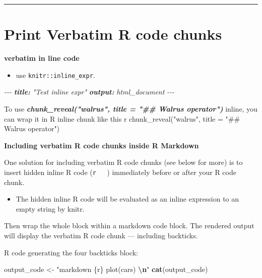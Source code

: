 \documentclass[
]{book}
\newenvironment{Shaded}{\begin{snugshade}}{\end{snugshade}}
\newcommand{\AnnotationTok}[1]{\textcolor[rgb]{0.56,0.35,0.01}{\textbf{\textit{#1}}}}
\newcommand{\CommentTok}[1]{\textcolor[rgb]{0.56,0.35,0.01}{\textit{#1}}}
\newcommand{\FunctionTok}[1]{\textcolor[rgb]{0.13,0.29,0.53}{\textbf{#1}}}
\newcommand{\InformationTok}[1]{\textcolor[rgb]{0.56,0.35,0.01}{\textbf{\textit{#1}}}}
\newcommand{\NormalTok}[1]{#1}
\newcommand{\OtherTok}[1]{\textcolor[rgb]{0.56,0.35,0.01}{#1}}
\newcommand{\SpecialCharTok}[1]{\textcolor[rgb]{0.81,0.36,0.00}{\textbf{#1}}}
\newcommand{\StringTok}[1]{\textcolor[rgb]{0.31,0.60,0.02}{#1}}
\providecommand{\tightlist}{%
  \setlength{\itemsep}{0pt}\setlength{\parskip}{0pt}}
\theoremstyle{definition}
\theoremstyle{definition}
\theoremstyle{definition}
\theoremstyle{definition}
\theoremstyle{remark}
\begin{document}
\begin{center}\rule{0.5\linewidth}{0.5pt}\end{center}

\section{Print Verbatim R code chunks}\label{print-verbatim-r-code-chunks}

\textbf{verbatim in line code}

\begin{itemize}
\tightlist
\item
  use \texttt{knitr::inline\_expr}.
\end{itemize}

\begin{Shaded}
\begin{Highlighting}[]
\CommentTok{{-}{-}{-}}
\AnnotationTok{title:}\CommentTok{ "Test inline expr"}
\AnnotationTok{output:}\CommentTok{ html\_document}
\CommentTok{{-}{-}{-}}

\NormalTok{To use }\InformationTok{\textasciigrave{}chunk\_reveal("walrus", title = "\#\# Walrus operator")\textasciigrave{}}\NormalTok{ inline, you can wrap it in R inline chunk like this \textasciigrave{}}\InformationTok{\textasciigrave{} \textasciigrave{}}\NormalTok{r chunk\_reveal("walrus", title = "\#\# Walrus operator")\textasciigrave{} \textasciigrave{}\textasciigrave{}}
\end{Highlighting}
\end{Shaded}

\textbf{Including verbatim R code chunks inside R Markdown}

One solution for including verbatim R code chunks (see below for more) is to insert hidden inline R code (\texttt{\textasciigrave{}r\ \ \ \textquotesingle{}\textquotesingle{}\textasciigrave{}}) immediately before or after your R code chunk.

\begin{itemize}
\tightlist
\item
  The hidden inline R code will be evaluated as an inline expression to an empty string by knitr.
\end{itemize}

Then wrap the whole block within a markdown code block. The rendered output will display the verbatim R code chunk --- including backticks.

R code generating the four backticks block:

\begin{Shaded}
\begin{Highlighting}[]
\NormalTok{output\_code }\OtherTok{\textless{}{-}}
\StringTok{"\textasciigrave{}\textasciigrave{}\textasciigrave{}\textasciigrave{}markdown}
\StringTok{\textasciigrave{}\textasciigrave{}\textasciigrave{}\{r\}}
\StringTok{plot(cars)}
\StringTok{\textasciigrave{}\textasciigrave{}\textasciigrave{} }\SpecialCharTok{\textbackslash{}n}\StringTok{\textasciigrave{}\textasciigrave{}\textasciigrave{}\textasciigrave{}"}
\FunctionTok{cat}\NormalTok{(output\_code)}
\end{Highlighting}
\end{Shaded}
\end{document}
